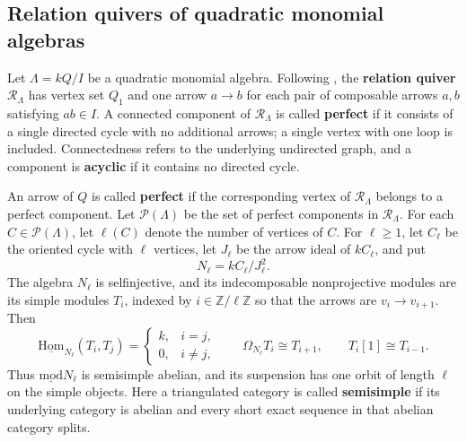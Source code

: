 \documentclass[11pt]{article}
\newcommand{\smod}{\operatorname{\underline{mod}}}
\newcommand{\sHom}{\operatorname{\underline{Hom}}}
\providecommand{\varLambda}{\Lambda}
\theoremstyle{definition}
\begin{document}
	\subsection{Relation quivers of quadratic monomial algebras}\label{subsection of relation quiver criterion}


		Let $\varLambda=kQ/I$ be a quadratic monomial algebra.
		Following \cite[Definition~5.2]{CSZ18}, the \textbf{relation quiver} $\mathcal R_{\varLambda}$ has vertex set $Q_1$ and one arrow $a\rightarrow b$ for each pair of composable arrows $a,b$ satisfying $ab\in I$. A connected component of $\mathcal R_{\varLambda}$ is called \textbf{perfect} if it consists of a single directed cycle with no additional arrows; a single vertex with one loop is included. Connectedness refers to the underlying undirected graph, and a component is \textbf{acyclic} if it contains no directed cycle. 

		An arrow of $Q$ is called \textbf{perfect} if the corresponding vertex of $\mathcal R_{\varLambda}$ belongs to a perfect component. Let $\mathcal P(\varLambda)$ be the set of perfect components in $\mathcal R_{\varLambda}$. For each $C\in\mathcal P(\varLambda)$, let $\ell(C)$ denote the number of vertices of $C$.
		For $\ell\geq1$, let $C_\ell$ be the oriented cycle with $\ell$ vertices, let $J_\ell$ be the arrow ideal of $kC_\ell$, and put
		\[
			N_\ell=kC_\ell/J_\ell^2.
		\]
		The algebra $N_\ell$ is selfinjective, and its indecomposable nonprojective modules are its simple modules $T_i$, indexed by $i\in\mathbb Z/\ell\mathbb Z$ so that the arrows are $v_i\to v_{i+1}$. Then
		\[
			\sHom_{N_\ell}(T_i,T_j)=
			\begin{cases}k,&i=j,\\0,&i\ne j,\end{cases}
			\qquad \Omega_{N_\ell}T_i\cong T_{i+1},\qquad T_i[1]\cong T_{i-1}.
		\]
		Thus $\smod N_\ell$ is semisimple abelian, and its suspension has one orbit of length $\ell$ on the simple objects. Here a triangulated category is called \textbf{semisimple} if its underlying category is abelian and every short exact sequence in that abelian category splits.
\end{document}
